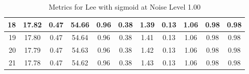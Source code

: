 \begin{table}[htb]
\begin{tabular}{|r|cccccccccc|}
      18 &  17.82 &  0.47 &  54.66 &  0.96 &  0.38 &  1.39 &  0.13 &  1.06 &  0.98 &  0.98  \\ \hline 
      19 &  17.80 &  0.47 &  54.64 &  0.96 &  0.38 &  1.41 &  0.13 &  1.06 &  0.98 &  0.98  \\ \hline 
      20 &  17.79 &  0.47 &  54.63 &  0.96 &  0.38 &  1.42 &  0.13 &  1.06 &  0.98 &  0.98  \\ \hline 
      21 &  17.78 &  0.47 &  54.62 &  0.96 &  0.38 &  1.43 &  0.13 &  1.06 &  0.98 &  0.98  \\ \hline 
    \end{tabular}
    \caption{Metrics for Lee with sigmoid at Noise Level 1.00}
    \end{table}


